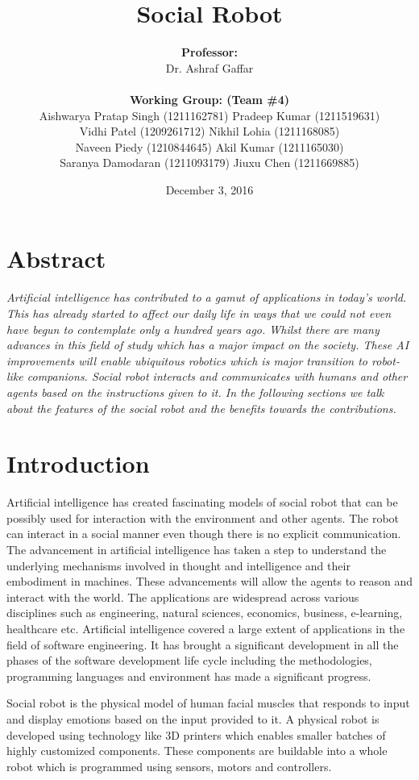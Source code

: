 \documentclass[letterpaper,12pt]{article}
\title{Social Robot}
\author{\textbf{Professor:} \\  Dr. Ashraf Gaffar \\
\\
  \textbf{Working Group: (Team \#4)} \\
  Aishwarya Pratap Singh (1211162781) \quad Pradeep Kumar (1211519631) \\
  Vidhi Patel (1209261712) \quad Nikhil Lohia (1211168085) \\
  Naveen Piedy (1210844645) \quad Akil Kumar (1211165030) \\
  Saranya Damodaran (1211093179) \quad Jiuxu Chen (1211669885)}
\date{December 3, 2016}
\begin{document}
\thispagestyle{empty}
\maketitle

\begin{multicols}{2}

\section{Abstract}
\textit{Artificial intelligence has contributed to a gamut of applications in today's world. This has already started to affect our daily life in ways that we could not even have begun to contemplate only a hundred years ago. Whilst there are many advances in this field of study which has a major impact on the society. These AI improvements will enable ubiquitous robotics which is major transition to robot-like companions. Social robot interacts and communicates with humans and other agents based on the instructions given to it. In the following sections we talk about the features of the social robot and the benefits towards the contributions.}

\section{Introduction}
Artificial intelligence has created fascinating models of social robot that can be possibly used for interaction with the environment and other agents. The robot can interact in a social manner even though there is no explicit communication. The advancement in artificial intelligence has taken a step to understand the underlying mechanisms involved in thought and intelligence and their embodiment in machines. These advancements will allow the agents to reason and interact with the world. The applications are widespread across various disciplines such as engineering, natural sciences, economics, business, e-learning, healthcare etc. Artificial intelligence covered a large extent of applications in the field of software engineering. It has brought a significant development in all the phases of the software development life cycle including the methodologies, programming languages and environment has made a significant progress. \\
\par
Social robot is the physical model of human facial muscles that responds to input and display emotions based on the input provided to it. A physical robot is developed using technology like 3D printers which enables smaller batches of highly customized components. These components are buildable into a whole robot which is programmed using sensors, motors and controllers. 


\end{multicols}
\end{document}
